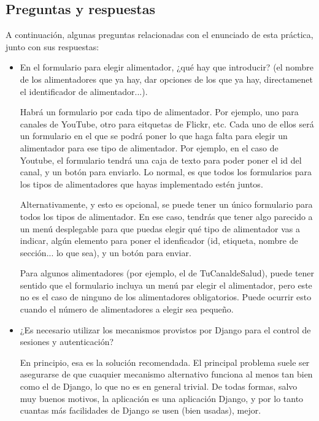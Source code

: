 \subsection{Preguntas y respuestas}

A continuación, algunas preguntas relacionadas con el enunciado de esta práctica, junto con sus respuestas:

\begin{itemize}

\item En el formulario para elegir alimentador, ¿qué hay que introducir? (el nombre de los alimentadores que ya hay, dar opciones de los que ya hay, directamenet el identificador de alimentador...).

  Habrá un formulario por cada tipo de alimentador. Por ejemplo, uno para canales de YouTube, otro para eitquetas de Flickr, etc. Cada uno de ellos será un formulario en el que se podrá poner lo que haga falta para elegir un alimentador para ese tipo de alimentador. Por ejemplo, en el caso de Youtube, el formulario tendrá una caja de texto para poder poner el id del canal, y un botón para enviarlo. Lo normal, es que todos los formularios para los tipos de alimentadores que hayas implementado estén juntos.

  Alternativamente, y esto es opcional, se puede tener un único formulario para todos los tipos de alimentador. En ese caso, tendrás que tener algo parecido a un menú desplegable para que puedas elegir qué tipo de alimentador vas a indicar, algún elemento para poner el idenficador (id, etiqueta, nombre de sección... lo que sea), y un botón para enviar.

  Para algunos alimentadores (por ejemplo, el de TuCanaldeSalud), puede tener sentido que el formulario incluya un menú par elegir el alimentador, pero este no es el caso de ninguno de los alimentadores obligatorios. Puede ocurrir esto cuando el número de alimentadores a elegir sea pequeño.
  
\item ¿Es necesario utilizar los mecanismos provistos por Django para el control de sesiones y autenticación?

  En principio, esa es la solución recomendada. El principal problema suele ser asegurarse de que cuaquier mecanismo alternativo funciona al menos tan bien como el de Django, lo que no es en general trivial. De todas formas, salvo muy buenos motivos, la aplicación es una aplicación Django, y por lo tanto cuantas más facilidades de Django se usen (bien usadas), mejor.


\end{itemize}
